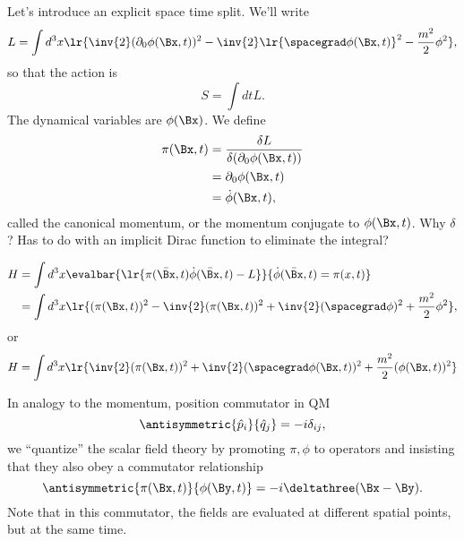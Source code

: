 Let's introduce an explicit space time split.  We'll write
\begin{equation}\label{eqn:qftLecture4:880}
L = \int d^3 x \lr{
\inv{2} (\partial_0 \phi(\Bx, t))^2 - \inv{2} \lr{ \spacegrad \phi(\Bx, t) }^2 - \frac{m^2}{2} \phi^2
},
\end{equation}
so that the action is
\begin{equation}\label{eqn:qftLecture4:900}
S = \int dt L.
\end{equation}
The dynamical variables are \( \phi(\Bx) \).  We define
\begin{equation}\label{eqn:qftLecture4:920}
\begin{aligned}
\pi(\Bx, t) 
&= \frac{\delta L}{\delta (\partial_0 \phi(\Bx, t))} \\
&= \partial_0 \phi(\Bx, t) \\
&= \dot{\phi}(\Bx, t),
\end{aligned}
\end{equation}
called the canonical momentum, or the momentum conjugate to \( \phi(\Bx, t) \).
Why \( \delta \)?  Has to do with an implicit Dirac function to eliminate the integral?

\begin{equation}\label{eqn:qftLecture4:940}
\begin{aligned}
H
&= \int d^3 x \evalbar{\lr{ \pi(\bar{\Bx}, t) \dot{\phi}(\bar{\Bx}, t) - L }}{\dot{\phi}(\bar{\Bx}, t) = \pi(x, t) } \\
&= \int d^3 x \lr{ (\pi(\Bx, t))^2 - \inv{2} (\pi(\Bx, t))^2 + \inv{2} (\spacegrad \phi)^2 + \frac{m^2}{2} \phi^2 },
\end{aligned}
\end{equation}
or
\begin{equation}\label{eqn:qftLecture4:960}
H = \int d^3 x \lr{ \inv{2} (\pi(\Bx, t))^2 + \inv{2} (\spacegrad \phi(\Bx, t))^2 + \frac{m^2}{2} (\phi(\Bx, t))^2 }
\end{equation}

In analogy to the momentum, position commutator in QM
\begin{equation}\label{eqn:qftLecture4:1000}
\antisymmetric{\hat{p}_i}{\hat{q}_j} = -i \delta_{ij},
\end{equation}
we ``quantize'' the scalar field theory by promoting \( \pi, \phi \) to operators and insisting that they also obey a commutator relationship
\begin{equation}\label{eqn:qftLecture4:980}
\antisymmetric{\pi(\Bx, t)}{\phi(\By, t)} = -i \deltathree(\Bx - \By).
\end{equation}
Note that in this commutator, the fields are evaluated at different spatial points, but at the same time.

